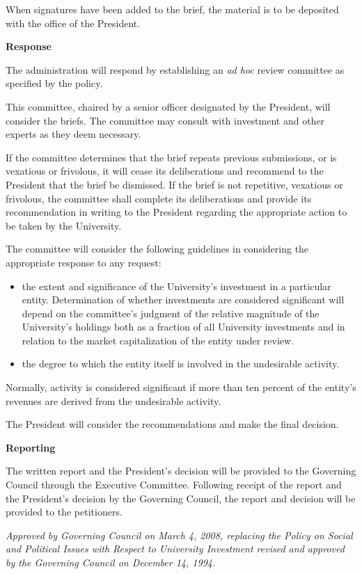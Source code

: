  

When signatures have been added to the brief, the material is to be deposited with the office of the President.

 

\textbf{Response}

 

The administration will respond by establishing an \emph{ad hoc} review committee as specified by the policy.

 

This committee, chaired by a senior officer designated by the President, will consider the briefs. The committee may consult with investment and other experts as they deem necessary.

 

If the committee determines that the brief repeats previous submissions, or is vexatious or frivolous, it will cease its deliberations and recommend to the President that the brief be dismissed. If the brief is not repetitive, vexatious or frivolous, the committee shall complete its deliberations and provide its recommendation in writing to the President regarding the appropriate action to be taken by the University.

 

The committee will consider the following guidelines in considering the appropriate response to any request:
\begin{itemize}
 	\item the extent and significance of the University's investment in a particular entity.  Determination of whether investments are considered significant will depend on the committee’s judgment of the relative magnitude of the University’s holdings both as a fraction of all University investments and in relation to the market capitalization of the entity under review.
	\item the degree to which the entity itself is involved in the undesirable activity.
\end{itemize}
Normally, activity is considered significant if more than ten percent of the entity's revenues are derived from the undesirable activity.

 

The President will consider the recommendations and make the final decision.

 

\textbf{Reporting}

 

The written report and the President's decision will be provided to the Governing Council through the Executive Committee. Following receipt of the report and the President’s decision by the Governing Council, the report and decision will be provided to the petitioners.

\emph{Approved by Governing Council on March 4, 2008, replacing the Policy on Social and Political Issues with Respect to University Investment revised and approved by the Governing Council on December 14, 1994.}

